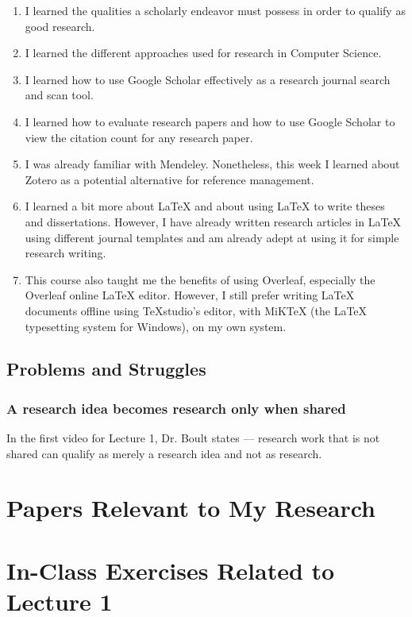 \documentclass[journal]{IEEEtran}
\begin{document}
\begin{enumerate}
	\item I learned the qualities a scholarly endeavor must possess in order to qualify as good research.  
	\item I learned the different approaches used for research in Computer Science.  
	\item I learned how to use Google Scholar effectively as a research journal search and scan tool.  
	\item I learned how to evaluate research papers and how to use Google Scholar to view the citation count for any research paper.  
	\item I was already familiar with Mendeley. Nonetheless, this week I learned about Zotero as a potential alternative for reference management.  
	\item I learned a bit more about LaTeX and about using LaTeX to write theses and dissertations. However, I have already written research articles in LaTeX using different journal templates and am already adept at using it for simple research writing.  
	\item This course also taught me the benefits of using Overleaf, especially the Overleaf online LaTeX editor. However, I still prefer writing LaTeX documents offline using TeXstudio's editor, with MiKTeX (the LaTeX typesetting system for Windows), on my own system.  	   
\end{enumerate}  

\subsection{Problems and Struggles}  

\subsubsection{A research idea becomes research only when shared}  

In the first video for Lecture 1, Dr. Boult states --- research work that is not shared can qualify as merely a research idea and not as research.    

\section{Papers Relevant to My Research}  



\section{In-Class Exercises Related to Lecture 1}
\label{sec:inclassexercises}   
\end{document}
